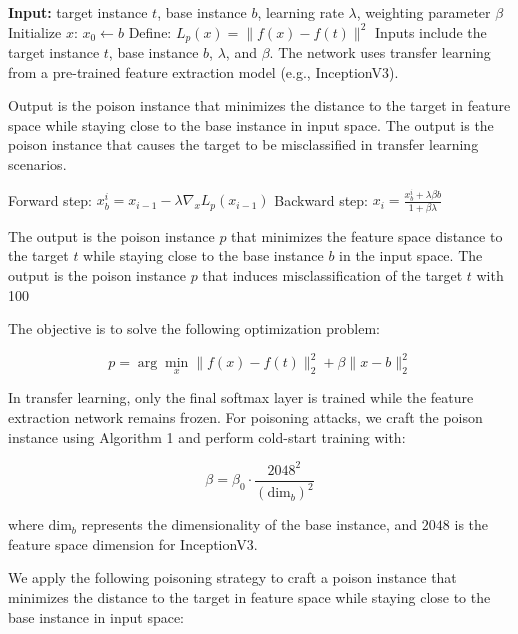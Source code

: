 
\STATE \textbf{Input:} target instance $t$, base instance $b$, learning rate $\lambda$, weighting parameter $\beta$
\STATE Initialize $x$: $x_0 \leftarrow b$
\STATE Define: $L_p(x) = \|f(x) - f(t)\|^2$
\STATE Inputs include the target instance $t$, base instance $b$, $\lambda$, and $\beta$. The network uses transfer learning from a pre-trained feature extraction model (e.g., InceptionV3).

\STATE Output is the poison instance that minimizes the distance to the target in feature space while staying close to the base instance in input space.
\STATE The output is the poison instance that causes the target to be misclassified in transfer learning scenarios.

    \STATE Forward step: $x_b^i = x_{i-1} - \lambda \nabla_x L_p(x_{i-1})$
    \STATE Backward step: $x_i = \frac{x_b^i + \lambda \beta b}{1 + \beta \lambda}$
\ENDFOR

\STATE The output is the poison instance $p$ that minimizes the feature space distance to the target $t$ while staying close to the base instance $b$ in the input space.
\STATE The output is the poison instance $p$ that induces misclassification of the target $t$ with 100\

\STATE The objective is to solve the following optimization problem:

\begin{equation}
p = \arg\min_x \|f(x) - f(t)\|_2^2 + \beta \|x - b\|_2^2
\end{equation}

\STATE In transfer learning, only the final softmax layer is trained while the feature extraction network remains frozen. For poisoning attacks, we craft the poison instance using Algorithm 1 and perform cold-start training with:

\begin{equation}
\beta = \beta_0 \cdot \frac{2048^2}{(\text{dim}_b)^2}
\end{equation}

\STATE where $\text{dim}_b$ represents the dimensionality of the base instance, and $2048$ is the feature space dimension for InceptionV3.

\STATE We apply the following poisoning strategy to craft a poison instance that minimizes the distance to the target in feature space while staying close to the base instance in input space:

